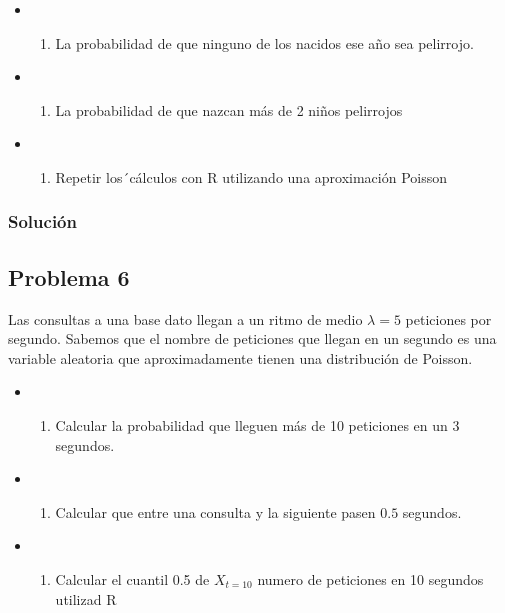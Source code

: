 \documentclass[
]{article}
\providecommand{\tightlist}{%
  \setlength{\itemsep}{0pt}\setlength{\parskip}{0pt}}
\begin{document}
\begin{itemize}
\item
  \begin{enumerate}
  \def\labelenumi{\alph{enumi})}
  \tightlist
  \item
    La probabilidad de que ninguno de los nacidos ese año sea pelirrojo.
  \end{enumerate}
\item
  \begin{enumerate}
  \def\labelenumi{\alph{enumi})}
  \setcounter{enumi}{1}
  \tightlist
  \item
    La probabilidad de que nazcan más de 2 niños pelirrojos
  \end{enumerate}
\item
  \begin{enumerate}
  \def\labelenumi{\alph{enumi})}
  \setcounter{enumi}{2}
  \tightlist
  \item
    Repetir los´cálculos con R utilizando una aproximación Poisson
  \end{enumerate}
\end{itemize}

\hypertarget{soluciuxf3n-4}{%
\subsubsection{Solución}\label{soluciuxf3n-4}}

\hypertarget{problema-6}{%
\subsection{Problema 6}\label{problema-6}}

Las consultas a una base dato llegan a un ritmo de medio \(\lambda=5\)
peticiones por segundo. Sabemos que el nombre de peticiones que llegan
en un segundo es una variable aleatoria que aproximadamente tienen una
distribución de Poisson.

\begin{itemize}
\item
  \begin{enumerate}
  \def\labelenumi{\alph{enumi})}
  \tightlist
  \item
    Calcular la probabilidad que lleguen más de 10 peticiones en un 3
    segundos.
  \end{enumerate}
\item
  \begin{enumerate}
  \def\labelenumi{\alph{enumi})}
  \setcounter{enumi}{1}
  \tightlist
  \item
    Calcular que entre una consulta y la siguiente pasen \(0.5\)
    segundos.
  \end{enumerate}
\item
  \begin{enumerate}
  \def\labelenumi{\alph{enumi})}
  \setcounter{enumi}{2}
  \tightlist
  \item
    Calcular el cuantil 0.5 de \(X_{t=10}\) numero de peticiones en 10
    segundos utilizad R
  \end{enumerate}
\end{itemize}
\end{document}
